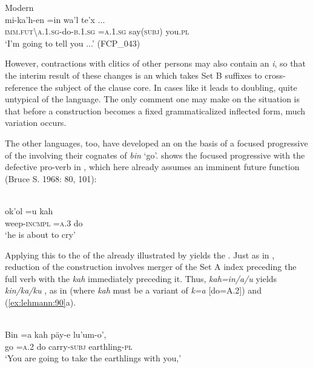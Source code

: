 \documentclass[output=paper]{langsci/langscibook}
\begin{document}
\ea\label{ex:lehmann:87}
Modern  \\
\gll       mi-ka'h-en            =in      wa'l       te'x ...\\
  \textsc{imm.fut{\textbackslash}a.1.sg}{}-do-\textsc{b.1.sg } \textsc{=a.1.sg}   say(\textsc{subj})  you.\textsc{pl}\\
\glt ‘I’m going to tell you ...’ (FCP\_043)
\z

However, contractions with clitics of other persons may also contain an \textit{i}, so that the interim result of these changes is an  which takes Set B suffixes to cross-reference the subject of the clause core. In cases like  it leads to doubling, quite untypical of the language. The only comment one may make on the situation is that before a construction becomes a fixed grammaticalized inflected form, much variation occurs.

The other  languages, too, have developed an  on the basis of a focused progressive of the  involving their cognates of  \textit{bin} ‘go’.  shows the focused progressive with the defective pro-verb in , which here already assumes an imminent future function (Bruce S. 1968: 80, 101):

\ea\label{ex:lehmann:88}
\\
\gll       ok’ol        =u    kah\\
  weep-\textsc{incmpl } \textsc{=a.3}    do\\
\glt ‘he is about to cry’ \citep[80]{Bruce1968}
\z

Applying this to the  of the  already illustrated by  yields the  . Just as in , reduction of the  construction involves merger of the Set A index preceding the  full verb with the  \textit{kah} immediately preceding it. Thus, \textit{kah=in/a/u} yields \textit{kin/ka/ku} \citep[95, 101]{Bruce1968}, as in  (where \textit{kah} must be a variant of \textit{k=a} [do=A.2]) and (\ref{ex:lehmann:90}a).

\ea\label{ex:lehmann:89}
\\
\gll       Bin  =a    kah  päy-e      lu’um-o’,\\
  go    =\textsc{a.2}   do    carry-\textsc{subj}    earthling-\textsc{pl}\\
\glt
‘You are going to take the earthlings with you,’ \citep[76]{Bruce1968}
\z
\end{document}
